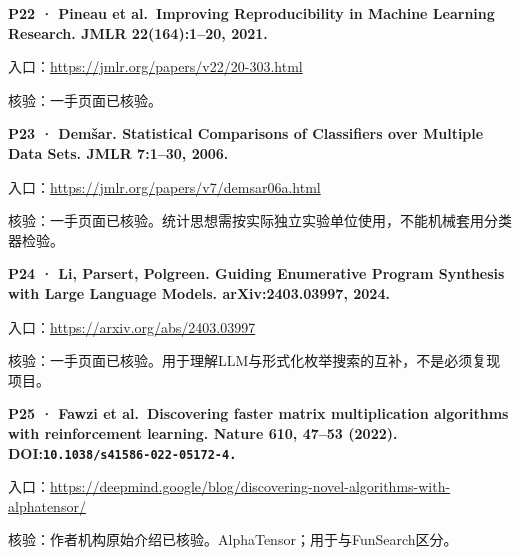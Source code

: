 \par\noindent\begin{minipage}{\linewidth}
\textbf{P22 · Pineau et al.~Improving Reproducibility in Machine
Learning Research. JMLR 22(164):1--20, 2021.}

入口：\url{https://jmlr.org/papers/v22/20-303.html}

核验：一手页面已核验。
\end{minipage}\par\vspace{6pt}

\par\noindent\begin{minipage}{\linewidth}
\textbf{P23 · Demšar. Statistical Comparisons of Classifiers over
Multiple Data Sets. JMLR 7:1--30, 2006.}

入口：\url{https://jmlr.org/papers/v7/demsar06a.html}

核验：一手页面已核验。统计思想需按实际独立实验单位使用，不能机械套用分类器检验。
\end{minipage}\par\vspace{6pt}

\par\noindent\begin{minipage}{\linewidth}
\textbf{P24 · Li, Parsert, Polgreen. Guiding Enumerative Program
Synthesis with Large Language Models. arXiv:\allowbreak{}2403.03997, 2024.}

入口：\url{https://arxiv.org/abs/2403.03997}

核验：一手页面已核验。用于理解LLM与形式化枚举搜索的互补，不是必须复现项目。
\end{minipage}\par\vspace{6pt}

\par\noindent\begin{minipage}{\linewidth}
\textbf{P25 · Fawzi et al.~Discovering faster matrix multiplication
algorithms with reinforcement learning. Nature 610, 47--53 (2022).
DOI:\allowbreak\nolinkurl{10.1038/s41586-022-05172-4.}}

入口：\url{https://deepmind.google/blog/discovering-novel-algorithms-with-alphatensor/}

核验：作者机构原始介绍已核验。AlphaTensor；用于与FunSearch区分。
\end{minipage}\par\vspace{6pt}

